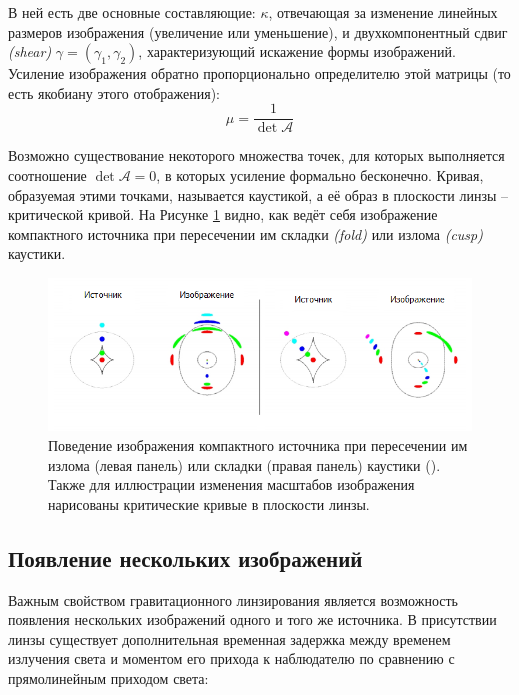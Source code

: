 В ней есть две основные составляющие: $\kappa$, отвечающая за изменение линейных размеров изображения (увеличение или уменьшение), и двухкомпонентный сдвиг \textit{(shear)} $\gamma=(\gamma_1,\gamma_2)$, характеризующий искажение формы изображений. Усиление изображения обратно пропорционально определителю этой матрицы (то есть якобиану этого отображения):
\begin{equation}
\mu=\frac{1}{\operatorname{det} \mathcal{A}}
\end{equation}

Возможно существование некоторого множества точек, для которых выполняется соотношение $\operatorname{det} \mathcal{A}=0$, в которых усиление формально бесконечно. Кривая, образуемая этими точками, называется каустикой, а её образ в плоскости линзы – критической кривой. На Рисунке \ref{fig:caustics} видно, как ведёт себя изображение компактного источника при пересечении им складки \textit{(fold)} или излома \textit{(cusp)} каустики.
 
\begin{figure}[H]
    \centering
	\includegraphics[scale=0.8]{pics/caust_intro.png}
	\caption{Поведение изображения компактного источника при пересечении им излома (левая панель) или складки (правая панель) каустики  (\cite{narbart}). Также для иллюстрации изменения масштабов изображения нарисованы критические кривые в плоскости линзы. \label{fig:caustics}}
\end{figure}

\subsection{Появление нескольких изображений}

Важным свойством гравитационного линзирования является возможность появления нескольких изображений одного и того же источника. В присутствии линзы существует дополнительная временная задержка между временем излучения света и моментом его прихода к наблюдателю по сравнению с прямолинейным приходом света:

